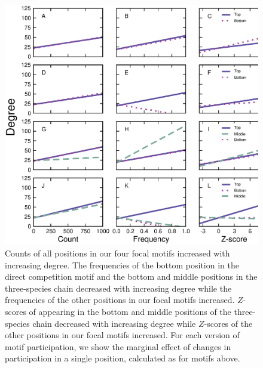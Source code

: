 \documentclass[12pt]{article}
\begin{document}
    \begin{figure}[ht!]
        \centering
        \includegraphics[width=\textwidth]{figures/positions_vs_Deg.eps}
        \caption{Counts of all positions in our four focal motifs increased with increasing degree. The frequencies of the bottom position in the direct competition motif and the bottom and middle positions in the three-species chain decreased with increasing degree while the frequencies of the other positions in our focal motifs increased. $Z$-scores of appearing in the bottom and middle positions of the three-species chain decreased with increasing degree while $Z$-scores of the other positions in our focal motifs increased. For each version of motif participation, we show the marginal effect of changes in participation in a single position, calculated as for motifs above.}
        \label{fig:positions_deg}
    \end{figure}
\end{document}
